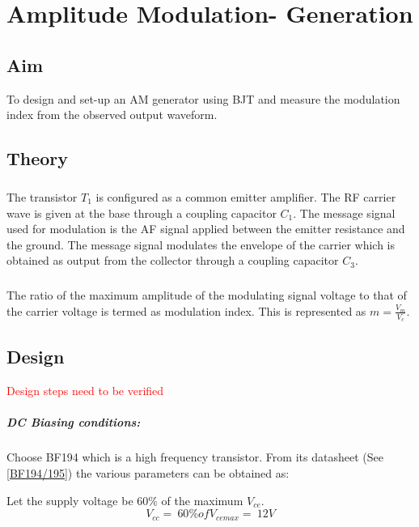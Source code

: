 \chapter[Amplitude Modulation- Generation]{Amplitude Modulation- Generation}

\section*{Aim}
To design and set-up  an AM generator using BJT and measure the modulation index from the observed output waveform.

\section*{Theory}
\paragraph{}
	The transistor $T_1$ is configured as a common emitter amplifier. The RF carrier wave is given at the base through a coupling capacitor $C_1$.  The message signal used for modulation is the AF signal applied between the emitter resistance and the ground. The message signal modulates the envelope of the carrier which is obtained as output from the collector through a coupling capacitor $C_3$. 
\paragraph{}
The ratio of the maximum amplitude of the modulating signal voltage to that of the carrier voltage is termed as modulation index. This is represented as $m=\frac{V_m}{V_c}$.


\section*{Design}
\textcolor{red}{Design steps need to be verified}

\paragraph{DC Biasing conditions:}
Choose BF194 which is a high frequency transistor. From its datasheet (See \ref{BF194/195}) the various parameters can be obtained as:

 
Let the supply voltage be 60\% of the maximum $V_{ce}$.  \begin{equation}
V_{cc}=\ 60\% of V_{cemax}=\ 12 V
\end{equation}

